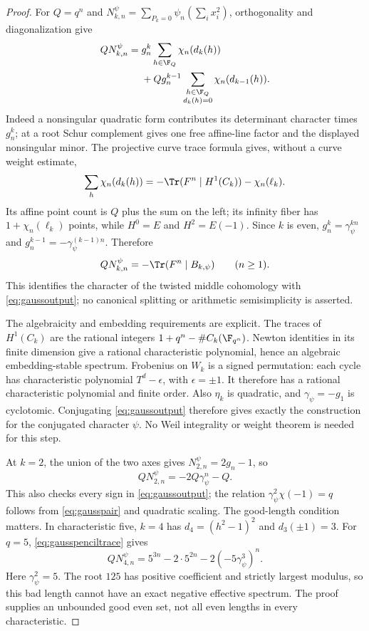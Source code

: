 \documentclass[11pt,a4paper]{article}
\theoremstyle{named}\newtheorem{finding}{Finding}[section]
\theoremstyle{definition}\newtheorem{definition}[finding]{Definition}
\theoremstyle{remark}\newtheorem{remark}[finding]{Remark}
\begin{document}
\begin{proof}
For $Q=q^n$ and
$N_{k,n}^\psi=\sum_{P_k=0}\psi_n(\sum_i x_i^2)$,
orthogonality and diagonalization give
\begin{align}
 QN_{k,n}^\psi
 ={}&g_n^k\sum_{h\in\F_Q}\chi_n(d_k(h))\notag\\
 &+Qg_n^{k-1}
       \sum_{\substack{h\in\F_Q\\d_k(h)=0}}
                         \chi_n(d_{k-1}(h)).
 \label{eq:gausspenciltrace}
\end{align}
Indeed a nonsingular quadratic form contributes its
determinant character times $g_n^k$; at a root Schur
complement gives one free affine-line factor and the
displayed nonsingular minor. The projective curve trace
formula gives, without a curve weight estimate,
\[
 \sum_h\chi_n(d_k(h))
 =-\Tr(F^n\mid H^1(C_k))-\chi_n(\ell_k).
\]
Its affine point count is $Q$ plus the sum on the left;
its infinity fiber has $1+\chi_n(\ell_k)$ points, while
$H^0=E$ and $H^2=E(-1)$.
Since $k$ is even, $g_n^k=\gamma_\psi^{kn}$ and
$g_n^{k-1}=-\gamma_\psi^{(k-1)n}$. Therefore
\begin{equation}\label{eq:gaussnegativesign}
 QN_{k,n}^\psi=-\Tr(F^n\mid B_{k,\psi})
                      \qquad(n\ge1).
\end{equation}
This identifies the character of the twisted middle
cohomology with \eqref{eq:gaussoutput}; no canonical
splitting or arithmetic semisimplicity is asserted.

The algebraicity and embedding requirements are explicit.
The traces of $H^1(C_k)$ are the rational integers
$1+q^n-\#C_k(\F_{q^n})$. Newton identities in its finite
dimension give a rational characteristic polynomial, hence
an algebraic embedding-stable spectrum. Frobenius on $W_k$
is a signed permutation: each cycle has characteristic polynomial
$T^d-\epsilon$, with $\epsilon=\pm1$. It therefore has a rational
characteristic polynomial and finite order. Also $\eta_k$ is quadratic, and
$\gamma_\psi=-g_1$ is cyclotomic. Conjugating
\eqref{eq:gaussoutput} therefore gives exactly the
construction for the conjugated character $\psi$.
No Weil integrality or weight theorem is needed for this step.

At $k=2$, the union of the two axes gives
$N_{2,n}^\psi=2g_n-1$, so
\[
 QN_{2,n}^\psi=-2Q\gamma_\psi^n-Q.
\]
This also checks every sign in \eqref{eq:gaussoutput};
the relation $\gamma_\psi^2\chi(-1)=q$ follows from
\eqref{eq:gausspair} and quadratic scaling.
The good-length condition matters. In characteristic five,
$k=4$ has $d_4=(h^2-1)^2$ and $d_3(\pm1)=3$.
For $q=5$, \eqref{eq:gausspenciltrace} gives
\[
 QN_{4,n}^\psi=5^{3n}-2\cdot5^{2n}
                         -2(-5\gamma_\psi^3)^n.
\]
Here $\gamma_\psi^2=5$. The root $125$ has positive
coefficient and strictly largest modulus, so this bad
length cannot have an exact negative effective spectrum.
The proof supplies an unbounded good even set, not all
even lengths in every characteristic.


\end{proof}
\end{document}
